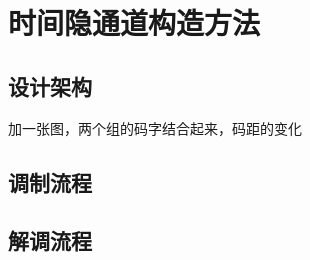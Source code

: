 \section{时间隐通道构造方法}
\label{chap:zigzag:model}

\subsection{设计架构}
\label{chap:zigzag:model:system}

加一张图，两个组的码字结合起来，码距的变化

\subsection{调制流程}
\label{chap:zigzag:model:modulation}

\subsection{解调流程}
\label{chap:zigzag:model:demodulation}
